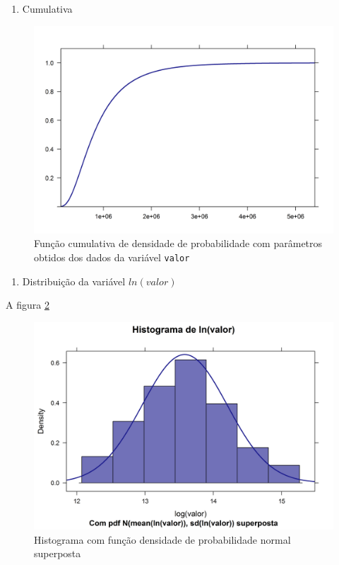 \documentclass[a4paper]{article}
\providecommand{\tightlist}{%
  \setlength{\itemsep}{0pt}\setlength{\parskip}{0pt}}
\let\code=\texttt
\begin{document}
\begin{enumerate}
\def\labelenumi{\alph{enumi}.}
\setcounter{enumi}{2}
\tightlist
\item
  Cumulativa
\end{enumerate}

\begin{figure}[H]

{\centering \includegraphics[width=0.7\linewidth]{images/cdf-1} 

}

\caption{Função cumulativa de densidade de probabilidade com parâmetros obtidos dos dados da variável \code{valor}}\label{fig:cdf}
\end{figure}

\begin{enumerate}
\def\labelenumi{\alph{enumi}.}
\setcounter{enumi}{3}
\tightlist
\item
  Distribuição da variável \(ln(valor)\)
\end{enumerate}

A figura \ref{fig:hist_densidade2}

\begin{figure}[H]

{\centering \includegraphics[width=0.7\linewidth]{images/hist_densidade2-1} 

}

\caption{Histograma com função densidade de probabilidade normal superposta}\label{fig:hist_densidade2}
\end{figure}
\end{document}
